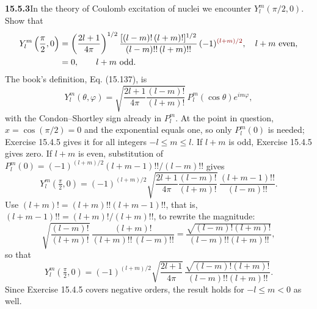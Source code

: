 \par\bigskip
\noindent\textbf{15.5.3}\quad In the theory of Coulomb excitation of
nuclei we encounter $Y_{l}^{m}(\pi/2,0)$. Show that
\begin{align*}
Y_{l}^{m}\left(\frac{\pi}{2},0\right)
&=\left(\frac{2l+1}{4\pi}\right)^{1/2}
\frac{[(l-m)!\,(l+m)!]^{1/2}}{(l-m)!!\,(l+m)!!}\,
(-1)^{\erratum{(l+m)/2}},\quad l+m\text{ even},\\
&=0,\qquad l+m\text{ odd}.
\end{align*}
\solution
The book's definition, Eq. (15.137), is
\[
Y_l^m(\theta,\varphi)=
\sqrt{\frac{2l+1}{4\pi}\frac{(l-m)!}{(l+m)!}}\,
P_l^m(\cos\theta)e^{im\varphi},
\]
with the Condon--Shortley sign already in $P_l^m$.
At the point in question, $x=\cos(\pi/2)=0$ and the exponential
equals one, so only $P_l^m(0)$ is needed; Exercise 15.4.5 gives it
for all integers $-l\le m\le l$.
If $l+m$ is odd, Exercise 15.4.5 gives zero.
If $l+m$ is even, substitution of
$P_l^m(0)=(-1)^{(l+m)/2}(l+m-1)!!/(l-m)!!$ gives
\[
Y_l^m(\tfrac\pi2,0)=
(-1)^{(l+m)/2}
\sqrt{\frac{2l+1}{4\pi}\frac{(l-m)!}{(l+m)!}}\,
\frac{(l+m-1)!!}{(l-m)!!}.
\]
Use $(l+m)!=(l+m)!!(l+m-1)!!$, that is,
$(l+m-1)!!=(l+m)!/(l+m)!!$, to rewrite the magnitude:
\[
\sqrt{\frac{(l-m)!}{(l+m)!}}\,\frac{(l+m)!}{(l+m)!!\,(l-m)!!}
=\frac{\sqrt{(l-m)!(l+m)!}}{(l-m)!!(l+m)!!},
\]
so that
\[
\boxed{Y_l^m(\tfrac\pi2,0)=
(-1)^{(l+m)/2}\sqrt{\frac{2l+1}{4\pi}}\,
\frac{\sqrt{(l-m)!(l+m)!}}{(l-m)!!(l+m)!!}}.
\]
Since Exercise 15.4.5 covers negative orders, the result holds for
$-l\le m<0$ as well.

